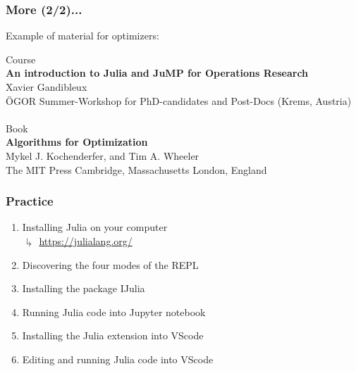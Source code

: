 \documentclass[]{beamer}
\begin{document}
% 
%

\begin{frame}
  \frametitle{More (2/2)...}
\vspace{3mm}

Example of material for optimizers:\vspace{6mm}\\
{\footnotesize

Course \vspace{2mm}\\
\quad \textbf{An introduction to Julia and JuMP for Operations Research}\\
\quad Xavier Gandibleux\\
\quad ÖGOR Summer-Workshop for PhD-candidates and Post-Docs (Krems, Austria)\\
\vspace{6mm}\\

Book \vspace{2mm}\\
\quad \textbf{Algorithms for Optimization}\\
\quad Mykel J. Kochenderfer, and Tim A. Wheeler\\
\quad The MIT Press Cambridge, Massachusetts London, England\\

}
\end{frame}

% 
%

\begin{frame}
  \frametitle{Practice}
\vspace{3mm}

\begin{enumerate}
\item Installing Julia on your computer\\
$\drsh$ {\tiny \url{https://julialang.org/}}

\item Discovering the four modes of the REPL\vspace{3mm}

\item Installing the package IJulia

\item Running Julia code into Jupyter notebook\vspace{3mm}

\item Installing the Julia extension into VScode

\item Editing and running Julia code into  VScode
\end{enumerate}

\end{frame}
\end{document}
